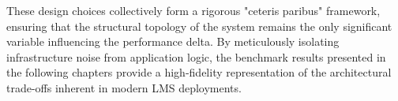 These design choices collectively form a rigorous "ceteris paribus" framework, ensuring that the structural topology of the system remains the only significant variable influencing the performance delta. By meticulously isolating infrastructure noise from application logic, the benchmark results presented in the following chapters provide a high-fidelity representation of the architectural trade-offs inherent in modern LMS deployments.